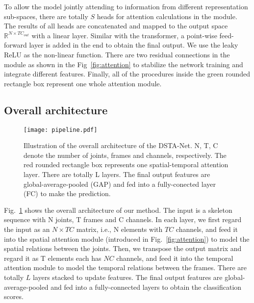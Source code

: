 \documentclass[runningheads]{llncs}
\begin{document}
To allow the model jointly attending to information from different representation sub-spaces, there are totally $S$ heads for attention calculations in the module. 
The results of all heads are concatenated and mapped to the output space $\mathbb{R}^{N\times TC_{out}}$ with a linear layer. 
Similar with the transformer, a point-wise feed-forward layer is added in the end to obtain the final output. 
We use the leaky ReLU as the non-linear function. 
There are two residual connections in the module as shown in the Fig~\ref{fig:attention} to stabilize the network training and integrate different features. 
Finally, all of the procedures inside the green rounded rectangle box represent one whole attention module. 


\subsection{Overall architecture}
\label{sec:architecture}

\begin{figure}[tp]
    \centering
    \texttt{[image: pipeline.pdf]}
    \caption{Illustration of the overall architecture of the DSTA-Net. 
    N, T, C denote the number of joints, frames and channels, respectively. 
The red rounded rectangle box represents one spatial-temporal attention layer. There are totally L layers. The final output features are global-average-pooled (GAP) and fed into a fully-conected layer (FC) to make the prediction.}
    \label{fig:pipeline}
\end{figure}{}

Fig.~\ref{fig:pipeline} shows the overall architecture of our method. 
The input is a skeleton sequence with N joints, T frames and C channels. 
In each layer, we first regard the input as an $N\times TC$ matrix, i.e., N elements with $TC$ channels, and feed it into the spatial attention module (introduced in Fig.~\ref{fig:attention}) to model the spatial relations between the joints. 
Then, we transpose the output matrix and regard it as T elements each has $NC$ channels, and feed it into the temporal attention module to model the temporal relations between the frames. 
There are totally $L$ layers stacked to update features. 
The final output features are global-average-pooled and fed into a fully-connected layers to obtain the classification scores. 
\end{document}
